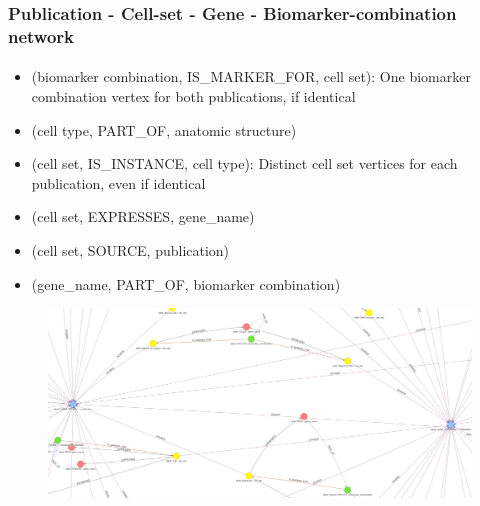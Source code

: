 \documentclass[aspectratio=169,xcolor=dvipsnames]{beamer}
\begin{document}
\begin{frame}
  \frametitle{Publication - Cell-set - Gene - Biomarker-combination network}
  \framesubtitle{}
  \begin{itemize}\tiny
  \item[] (biomarker combination, IS\_MARKER\_FOR, cell set): One
    biomarker combination vertex for both publications, if identical
  \item[] (cell type, PART\_OF, anatomic structure)
  \item[] (cell set, IS\_INSTANCE, cell type): Distinct cell set
    vertices for each publication, even if identical
  \item[] (cell set, EXPRESSES, gene\_name)
  \item[] (cell set, SOURCE, publication)
  \item[] (gene\_name, PART\_OF, biomarker combination)
  \end{itemize}
  \begin{figure}
    \begin{center}
      \includegraphics[height=0.6\textheight]{publication-cell-set-gene-biomarker-combination.jpeg}
    \end{center}
  \end{figure}
\end{frame}
\end{document}
